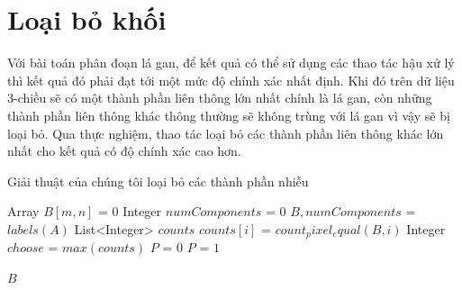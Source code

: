 \section{Loại bỏ khối}
Với bài toán phân đoạn lá gan, để kết quả có thể sử dụng các thao tác hậu xử lý thì kết quả đó phải đạt tới một mức độ chính xác nhất định. Khi đó trên dữ liệu 3-chiều sẽ có một thành phần liên thông lớn nhất chính là lá gan, còn những thành phần liên thông khác thông thường sẽ không trùng với lá gan vì vậy sẽ bị loại bỏ. Qua thực nghiệm, thao tác loại bỏ các thành phần liên thông khác lớn nhất cho kết quả có độ chính xác cao hơn.\\
\begin{algorithm}
  \caption{Giải thuật của chúng tôi loại bỏ các thành phần nhiễu}\label{remove_components}
  \begin{algorithmic}[1]
    \State Array $B[m,n]$ = $0$
    \State Integer $numComponents$ = $0$
    \State $B, numComponents$ = $labels(A)$ 
    \State List<Integer> $counts$
        \State $counts[i]$ = $count_pixel_equal(B, i)$
    \EndFor
    \State Integer $choose$ = $max(counts)$
            \State $P$ = $0$ 
        \Else
            \State $P$ = $1$
        \EndIf
    \EndFor
    
    \State \Return $B$
    \EndProcedure
  \end{algorithmic}
\end{algorithm}



